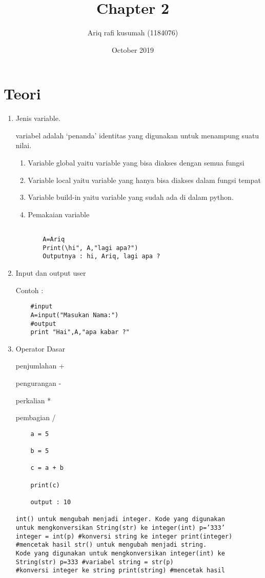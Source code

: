 \documentclass[12pt,times new roman]{article}
\title{Chapter 2}
\author{Ariq rafi kusumah (1184076)}
\date{October 2019}
\begin{document}
\maketitle

\section{Teori}
\begin{enumerate}
\item Jenis variable.
\par variabel adalah ‘penanda’ identitas yang digunakan untuk menampung suatu nilai.
\begin{enumerate}	
	\item Variable global yaitu variable yang bisa diakses dengan semua fungsi
	\item Variable local yaitu variable yang hanya bisa diakses dalam fungsi tempat 
	\item Variable build-in yaitu variable yang sudah ada di dalam python.
    \item Pemakaian variable
\begin{verbatim}

	A=Ariq 
	Print(\hi", A,"lagi apa?") 
	Outputnya : hi, Ariq, lagi apa ?

\end{verbatim}

\end{enumerate}

\item  Input dan output user
\par Contoh :
\begin{verbatim}
	#input
	A=input("Masukan Nama:")
	#output
	print "Hai",A,"apa kabar ?" 	
\end{verbatim}
\item Operator Dasar
\par penjumlahan +
\par pengurangan -
\par perkalian *
\par pembagian /
\begin{verbatim}
	a = 5

	b = 5

	c = a + b

	print(c)
	
	output : 10
	
int() untuk mengubah menjadi integer. Kode yang digunakan 
untuk mengkonversikan String(str) ke integer(int) p=’333’ 
integer = int(p) #konversi string ke integer print(integer) 
#mencetak hasil str() untuk mengubah menjadi string. 
Kode yang digunakan untuk mengkonversikan integer(int) ke 
String(str) p=333 #variabel string = str(p) 
#konversi integer ke string print(string) #mencetak hasil


\end{verbatim}
\end{enumerate}
\end{document}
